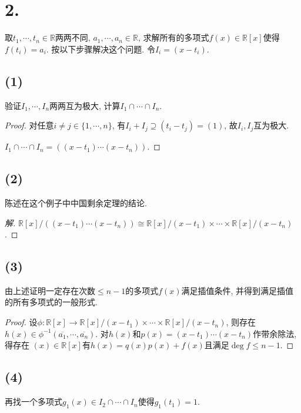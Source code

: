 \documentclass[12pt, a4paper, fontset=windows]{ctexart}
\newcommand{\R}{\mathbb{R}}
\newcommand{\cl}[1]{\overline{#1}} %
\newcommand{\isom}{\cong} %
\newcommand{\timess}{\times\cdots\times}
\newenvironment{solution}{\begin{proof}[解]}{\end{proof}}
\begin{document}
\section*{2.}

取$t_1,\cdots,t_n\in\R$两两不同, $a_1,\cdots,a_n\in\R$, 
求解所有的多项式$f(x)\in\R[x]$使得$f(t_i)=a_i$. 
按以下步骤解决这个问题. 令$I_i=(x-t_i)$. 

\subsection*{(1)}

验证$I_1,\cdots,I_n$两两互为极大, 计算$I_1\cap\cdots\cap I_n$. 

\begin{proof}
对任意$i\ne j\in\{1,\cdots,n\}$, 有$I_i+I_j\supseteq(t_i-t_j)=(1)$, 
故$I_i,I_j$互为极大. 

$I_1\cap\cdots\cap I_n=((x-t_1)\cdots(x-t_n))$. 
\end{proof}

\subsection*{(2)}

陈述在这个例子中中国剩余定理的结论. 

\begin{solution}
$\R[x]/((x-t_1)\cdots(x-t_n))\isom\R[x]/(x-t_1)\timess\R[x]/(x-t_n)$. 
\end{solution}

\subsection*{(3)}

由上述证明一定存在次数$\le n-1$的多项式$f(x)$满足插值条件, 
并得到满足插值的所有多项式的一般形式. 

\begin{proof}
设$\phi:\R[x]\to\R[x]/(x-t_1)\timess\R[x]/(x-t_n)$, 
则存在$h(x)\in\phi^{-1}(\cl{a_1},\cdots,\cl{a_n})$. 
对$h(x)$和$p(x)=(x-t_1)\cdots(x-t_n)$作带余除法, 得存在
$(x)\in\R[x]$有$h(x)=q(x)p(x)+f(x)$且满足$\deg f\le n-1$. 
\end{proof}

\subsection*{(4)}

再找一个多项式$g_1(x)\in I_2\cap\cdots\cap I_n$使得$g_1(t_1)=1$. 
\end{document}
